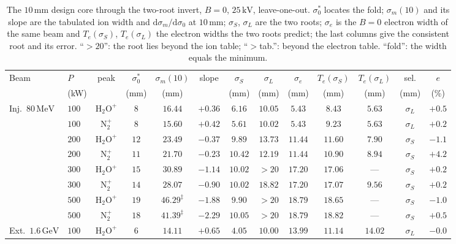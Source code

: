 \documentclass[hyperref]{cernrep}
\begin{document}
\begin{table}[htbp]
\centering
\caption{The $10\,\mathrm{mm}$ design core through the two-root
invert, $B=0$, $25\,\mathrm{kV}$, leave-one-out. $\sigma_0^*$ locates
the fold;
$\sigma_m(10)$ and its slope are the tabulated ion width and
$\mathrm{d}\sigma_m/\mathrm{d}\sigma_0$ at $10\,\mathrm{mm}$;
$\sigma_S$, $\sigma_L$ are the two roots; $\sigma_e$ is the $B=0$
electron width of the same beam and $T_e(\sigma_S)$, $T_e(\sigma_L)$
the electron widths the two roots predict; the last columns give the
consistent root and its error. ``$>20$'': the root lies beyond the
ion table; ``$>$tab.'': beyond the electron table. ``fold'': the width
equals the minimum.}
\label{tab:invcore}
{\footnotesize
\setlength{\tabcolsep}{3.2pt}
\begin{tabular}{llccccccccccc}
\hline\hline
Beam & $P$ & peak & $\sigma_0^*$ & $\sigma_m(10)$ & slope &
$\sigma_S$ & $\sigma_L$ & $\sigma_e$ & $T_e(\sigma_S)$ & $T_e(\sigma_L)$ & sel. & $e$ \\
 & (kW) & & (mm) & (mm) & & (mm) & (mm) & (mm) & (mm) & (mm) & (mm) & (\%) \\
\hline
Inj.\ $80\,\mathrm{MeV}$ & $100$ & $\mathrm{H}_2\mathrm{O}^+$ & $8$ & $16.44$ & $+0.36$ & $6.16$ & $10.05$ & $5.43$ & $8.43$ & $5.63$ & $\sigma_L$ & $+0.5$ \\
 & $100$ & $\mathrm{N}_2^+$ & $8$ & $15.60$ & $+0.42$ & $5.61$ & $10.02$ & $5.43$ & $9.23$ & $5.63$ & $\sigma_L$ & $+0.2$ \\
 & $200$ & $\mathrm{H}_2\mathrm{O}^+$ & $12$ & $23.49$ & $-0.37$ & $9.89$ & $13.73$ & $11.44$ & $11.60$ & $7.90$ & $\sigma_S$ & $-1.1$ \\
 & $200$ & $\mathrm{N}_2^+$ & $11$ & $21.70$ & $-0.23$ & $10.42$ & $12.19$ & $11.44$ & $10.90$ & $8.94$ & $\sigma_S$ & $+4.2$ \\
 & $300$ & $\mathrm{H}_2\mathrm{O}^+$ & $15$ & $30.89$ & $-1.14$ & $10.02$ & $>20$ & $17.20$ & $17.06$ & --- & $\sigma_S$ & $+0.2$ \\
 & $300$ & $\mathrm{N}_2^+$ & $14$ & $28.07$ & $-0.90$ & $10.02$ & $18.82$ & $17.20$ & $17.07$ & $9.56$ & $\sigma_S$ & $+0.2$ \\
 & $500$ & $\mathrm{H}_2\mathrm{O}^+$ & $19$ & $46.29^\ddagger$ & $-1.88$ & $9.90$ & $>20$ & $18.79$ & $18.65$ & --- & $\sigma_S$ & $-1.0$ \\
 & $500$ & $\mathrm{N}_2^+$ & $18$ & $41.39^\ddagger$ & $-2.29$ & $10.05$ & $>20$ & $18.79$ & $18.82$ & --- & $\sigma_S$ & $+0.5$ \\
\hline
Ext.\ $1.6\,\mathrm{GeV}$ & $100$ & $\mathrm{H}_2\mathrm{O}^+$ & $6$ & $14.11$ & $+0.65$ & $4.05$ & $10.00$ & $13.99$ & $11.14$ & $14.02$ & $\sigma_L$ & $-0.0$ \\

\end{tabular}}
\end{table}
\end{document}
